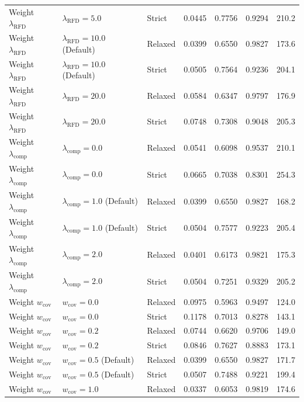 \begin{tabular}{lllllll}
Weight $\lambda_{\mathrm{RFD}}$ & $\lambda_{\mathrm{RFD}}=5.0$ & Strict & 0.0445 & 0.7756 & 0.9294 & 210.2 \\
Weight $\lambda_{\mathrm{RFD}}$ & $\lambda_{\mathrm{RFD}}=10.0$ (Default) & Relaxed & 0.0399 & 0.6550 & 0.9827 & 173.6 \\
Weight $\lambda_{\mathrm{RFD}}$ & $\lambda_{\mathrm{RFD}}=10.0$ (Default) & Strict & 0.0505 & 0.7564 & 0.9236 & 204.1 \\
Weight $\lambda_{\mathrm{RFD}}$ & $\lambda_{\mathrm{RFD}}=20.0$ & Relaxed & 0.0584 & 0.6347 & 0.9797 & 176.9 \\
Weight $\lambda_{\mathrm{RFD}}$ & $\lambda_{\mathrm{RFD}}=20.0$ & Strict & 0.0748 & 0.7308 & 0.9048 & 205.3 \\
Weight $\lambda_{\mathrm{comp}}$ & $\lambda_{\mathrm{comp}}=0.0$ & Relaxed & 0.0541 & 0.6098 & 0.9537 & 210.1 \\
Weight $\lambda_{\mathrm{comp}}$ & $\lambda_{\mathrm{comp}}=0.0$ & Strict & 0.0665 & 0.7038 & 0.8301 & 254.3 \\
Weight $\lambda_{\mathrm{comp}}$ & $\lambda_{\mathrm{comp}}=1.0$ (Default) & Relaxed & 0.0399 & 0.6550 & 0.9827 & 168.2 \\
Weight $\lambda_{\mathrm{comp}}$ & $\lambda_{\mathrm{comp}}=1.0$ (Default) & Strict & 0.0504 & 0.7577 & 0.9223 & 205.4 \\
Weight $\lambda_{\mathrm{comp}}$ & $\lambda_{\mathrm{comp}}=2.0$ & Relaxed & 0.0401 & 0.6173 & 0.9821 & 175.3 \\
Weight $\lambda_{\mathrm{comp}}$ & $\lambda_{\mathrm{comp}}=2.0$ & Strict & 0.0504 & 0.7251 & 0.9329 & 205.2 \\
Weight $w_{\mathrm{cov}}$ & $w_{\mathrm{cov}}=0.0$ & Relaxed & 0.0975 & 0.5963 & 0.9497 & 124.0 \\
Weight $w_{\mathrm{cov}}$ & $w_{\mathrm{cov}}=0.0$ & Strict & 0.1178 & 0.7013 & 0.8278 & 143.1 \\
Weight $w_{\mathrm{cov}}$ & $w_{\mathrm{cov}}=0.2$ & Relaxed & 0.0744 & 0.6620 & 0.9706 & 149.0 \\
Weight $w_{\mathrm{cov}}$ & $w_{\mathrm{cov}}=0.2$ & Strict & 0.0846 & 0.7627 & 0.8883 & 173.1 \\
Weight $w_{\mathrm{cov}}$ & $w_{\mathrm{cov}}=0.5$ (Default) & Relaxed & 0.0399 & 0.6550 & 0.9827 & 171.7 \\
Weight $w_{\mathrm{cov}}$ & $w_{\mathrm{cov}}=0.5$ (Default) & Strict & 0.0507 & 0.7488 & 0.9221 & 199.4 \\
Weight $w_{\mathrm{cov}}$ & $w_{\mathrm{cov}}=1.0$ & Relaxed & 0.0337 & 0.6053 & 0.9819 & 174.6 \\

\end{tabular}
